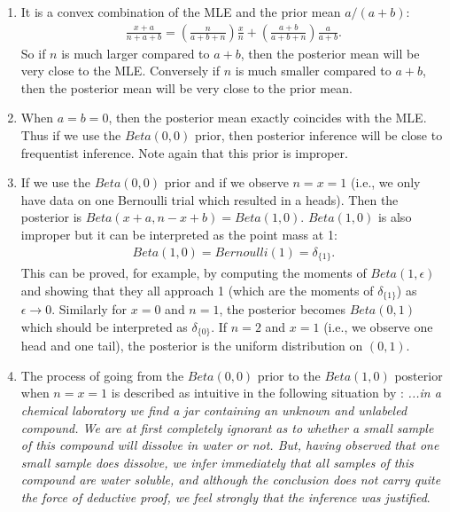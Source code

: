 \documentclass{scrartcl}
\begin{document}
\begin{enumerate}
\item It is a convex combination of the MLE and the prior mean
  $a/(a+b)$:
  \begin{align*}
    \frac{x+a}{n + a + b} = \left(\frac{n}{a+b+n} \right) \frac{x}{n}
    + \left(\frac{a+b}{a+b+n} \right) \frac{a}{a+b}. 
  \end{align*}
  So if $n$ is much larger compared to $a+b$, then the posterior mean
  will be very close to the MLE. Conversely if $n$ is much smaller
  compared to $a + b$, then the posterior mean will be very close to
  the prior mean.
\item When $a = b = 0$, then the posterior mean exactly coincides with
  the MLE. Thus if we use the $Beta(0, 0)$ prior, then posterior
  inference will be close to frequentist inference. Note again that
  this prior is improper.
\item If we use the $Beta(0, 0)$ prior and if we observe $n = x = 1$
  (i.e., we only have data on one Bernoulli trial which resulted in a
  heads). Then the posterior is $Beta(x + a, n-x + b) =
  Beta(1,0)$. $Beta(1, 0)$ is also improper but it can be
  interpreted as the point mass at 1:
  \begin{align*}
    Beta(1, 0) = Bernoulli(1) = \delta_{\{1\}}. 
  \end{align*}
  This can be proved, for example, by computing the moments of
  $Beta(1, \epsilon)$ and showing that they all approach 1 (which are
  the moments of $\delta_{\{1\}}$) as $\epsilon \rightarrow 0$. 
  Similarly for $x = 0$ and $n = 1$, the posterior becomes $Beta(0,
  1)$ which should be interpreted as $\delta_{\{0\}}$. If $n = 2$ and
  $x = 1$ (i.e., we observe one head and one tail), the posterior is
  the uniform distribution on $(0, 1)$.
\item The process of going from the $Beta(0, 0)$ prior to the $Beta(1,
  0)$ posterior when $n = x = 1$ is described as intuitive in the
  following situation by \citet[Section 12.4.3]{Jaynes}: \textit{...in a
    chemical laboratory we find a jar containing an unknown and
    unlabeled compound. We are at first completely ignorant as to
    whether a small sample of this compound will dissolve in water or
    not. But, having observed that one small sample does dissolve, we
    infer immediately that all samples of this compound are water
    soluble, and although the conclusion does not carry quite the
    force of deductive proof, we feel strongly that the inference was
    justified}. 
\end{enumerate}
\end{document}

